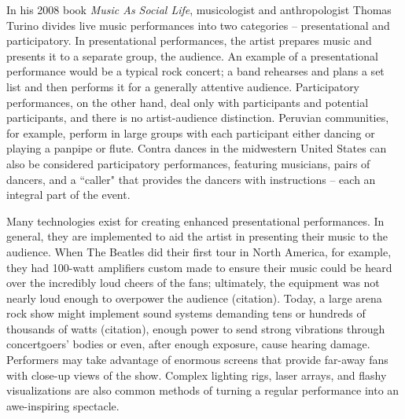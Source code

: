 In his 2008 book \textit{Music As Social Life}, musicologist and anthropologist Thomas Turino divides live music performances into two categories -- presentational and participatory. In presentational performances, the artist prepares music and presents it to a separate group, the audience. An example of a presentational performance would be a typical rock concert; a band rehearses and plans a set list and then performs it for a generally attentive audience. Participatory performances, on the other hand, deal only with participants and potential participants, and there is no artist-audience distinction. Peruvian communities, for example, perform in large groups with each participant either dancing or playing a panpipe or flute. Contra dances in the midwestern United States can also be considered participatory performances, featuring musicians, pairs of dancers, and a ``caller" that provides the dancers with instructions -- each an integral part of the event.

Many technologies exist for creating enhanced presentational performances. In general, they are implemented to aid the artist in presenting their music to the audience. When The Beatles did their first tour in North America, for example, they had 100-watt amplifiers custom made to ensure their music could be heard over the incredibly loud cheers of the fans; ultimately, the equipment was not nearly loud enough to overpower the audience (citation). Today, a large arena rock show might implement sound systems demanding tens or hundreds of thousands of watts (citation), enough power to send strong vibrations through concertgoers' bodies or even, after enough exposure, cause hearing damage. Performers may take advantage of enormous screens that provide far-away fans with close-up views of the show. Complex lighting rigs, laser arrays, and flashy visualizations are also common methods of turning a regular performance into an awe-inspiring spectacle.

